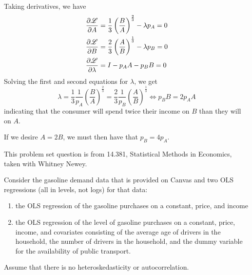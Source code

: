 \documentclass[answers, reflections]{padajar-pset}
\begin{document}
\begin{questions}
\begin{parts}
\begin{subparts}
\begin{solution}
				Taking derivatives, we have
				\begin{align*}
					\pdv{\mathscr{L}}{A} & = \frac13 \left(\frac{B}{A}\right)^{\frac23} - \lambda p_A =0 \\
					\pdv{\mathscr{L}}{B} & = \frac23 \left(\frac{A}{B}\right)^{\frac13} - \lambda p_B =0 \\
					\pdv{\mathscr{L}}{\lambda} & = I - p_A A - p_BB = 0
				\end{align*}
				Solving the first and second equations for $\lambda$, we get
				\[
				\lambda = \frac13 \frac{1}{p_A}\left(\frac{B}{A}\right)^{\frac23} = \frac23 \frac{1}{p_B} \left(\frac{A}{B}\right)^{\frac13} \iff p_B B = 2p_A A
				\]
				indicating that the consumer will spend twice their income on $B$ than they will on $A$.

				If we desire $A = 2B$, we must then have that $p_B = 4 p_A$.
			\end{solution}
			\begin{reflection}
				\lipsum[4]
			\end{reflection}
		\end{subparts}
	\end{parts}


	This problem set question is from 14.381, Statistical Methods in Economics, taken with Whitney Newey.

	Consider the gasoline demand data that is provided on Canvas and two OLS regressions (all in levels, not logs) for that data:
	\begin{enumerate}[label=\roman*)]
		\item the OLS regression of the gasoline purchases on a constant, price, and income
		\item the OLS regression of the level of gasoline purchases on a constant, price, income, and covariates consisting of the average age of drivers in the household, the number of drivers in the household, and the dummy variable for the availability of public transport.
	\end{enumerate}
	Assume that there is no heteroskedasticity or autocorrelation.

\end{questions}
\end{document}
